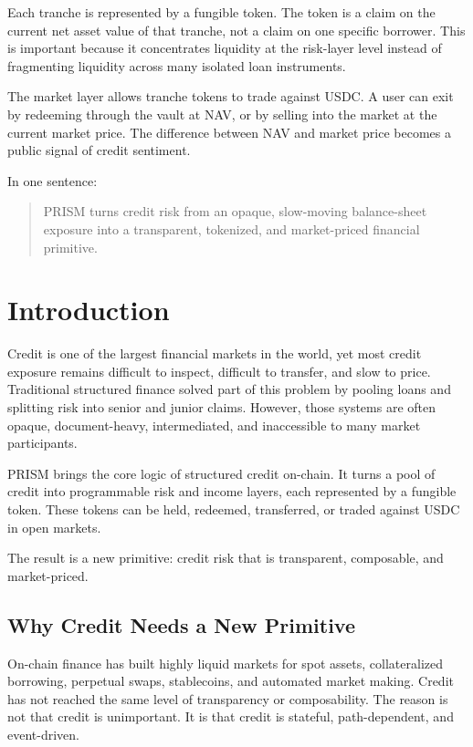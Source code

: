 \documentclass[11pt]{article}
\begin{document}
Each tranche is represented by a fungible token. The token is a claim on the
current net asset value of that tranche, not a claim on one specific borrower.
This is important because it concentrates liquidity at the risk-layer level
instead of fragmenting liquidity across many isolated loan instruments.

The market layer allows tranche tokens to trade against USDC. A user can exit by
redeeming through the vault at NAV, or by selling into the market at the current
market price. The difference between NAV and market price becomes a public signal
of credit sentiment.

In one sentence:

\begin{quote}
PRISM turns credit risk from an opaque, slow-moving balance-sheet exposure into
a transparent, tokenized, and market-priced financial primitive.
\end{quote}

\section{Introduction}

Credit is one of the largest financial markets in the world, yet most credit
exposure remains difficult to inspect, difficult to transfer, and slow to price.
Traditional structured finance solved part of this problem by pooling loans and
splitting risk into senior and junior claims. However, those systems are often
opaque, document-heavy, intermediated, and inaccessible to many market
participants.

PRISM brings the core logic of structured credit on-chain. It turns a pool of
credit into programmable risk and income layers, each represented by a fungible
token. These tokens can be held, redeemed, transferred, or traded against USDC in
open markets.

The result is a new primitive: credit risk that is transparent, composable, and
market-priced.

\subsection{Why Credit Needs a New Primitive}

On-chain finance has built highly liquid markets for spot assets, collateralized
borrowing, perpetual swaps, stablecoins, and automated market making. Credit has
not reached the same level of transparency or composability. The reason is not
that credit is unimportant. It is that credit is stateful, path-dependent, and
event-driven.
\end{document}

